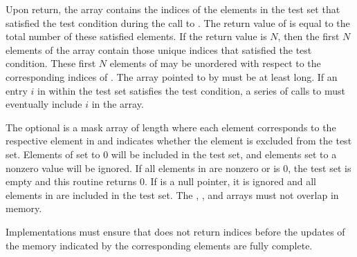 \begin{apidefinition}
{    Upon return, the  array contains the indices of the elements
    in the test set that satisfied the test condition during the call to
    .  The return value of
     is equal to the total number of
    these satisfied elements.  If the return value is $N$, then the first $N$
    elements of the  array contain those unique indices that
    satisfied the test condition.  These first $N$ elements of 
    may be unordered with respect to the corresponding indices of .
    The array pointed to by  must be at least  long.
    If an entry $i$ in  within the test set satisfies the test
    condition, a series of calls to 
    must eventually include $i$ in the  array.

    The optional  is a mask array of length  where each element
    corresponds to the respective element in  and indicates whether
    the element is excluded from the test set.  Elements of  set to
    0 will be included in the test set, and elements set to a nonzero value will be ignored.  If all
    elements in  are nonzero or  is 0, the test set is
    empty and this routine returns 0.  If  is a null pointer, it is ignored and all
    elements in  are included in the test set.  The ,
    , and  arrays must not overlap in memory.

    Implementations must ensure that  does not
    return indices before the updates of the memory indicated by the
    corresponding  elements are fully complete.
}


\end{apidefinition}
